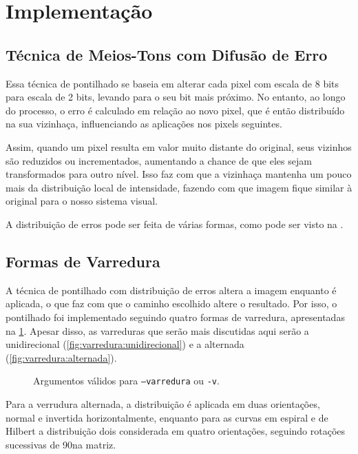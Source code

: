 \section{Implementação} \label{sec:impl}

\subsection{Técnica de Meios-Tons com Difusão de Erro}

    Essa técnica de pontilhado se baseia em alterar cada pixel com escala de 8 bits para escala de 2 bits, levando para o seu bit mais próximo. No entanto, ao longo do processo, o erro é calculado em relação ao novo pixel, que é então distribuído na sua vizinhaça, influenciando as aplicações nos pixels seguintes.

    Assim, quando um pixel resulta em valor muito distante do original, seus vizinhos são reduzidos ou incrementados, aumentando a chance de que eles sejam transformados para outro nível. Isso faz com que a vizinhaça mantenha um pouco mais da distribuição local de intensidade, fazendo com que imagem fique similar à original para o nosso sistema visual.

    A distribuição de erros pode ser feita de várias formas, como pode ser visto na .

\subsection{Formas de Varredura} \label{sec:varredura}

    A técnica de pontilhado com distribuição de erros altera a imagem enquanto é aplicada, o que faz com que o caminho escolhido altere o resultado. Por isso, o pontilhado foi implementado seguindo quatro formas de varredura, apresentadas na \cref{fig:varredura}. Apesar disso, as varreduras que serão mais discutidas aqui serão a unidirecional (\ref{fig:varredura:unidirecional}) e a alternada (\ref{fig:varredura:alternada}).

    \begin{figure}[H]
        \centering
        

        \caption{Argumentos válidos para \texttt{--varredura} ou \texttt{-v}.}
        \label{fig:varredura}
    \end{figure}

    Para a verrudura alternada, a distribuição é aplicada em duas orientações, normal e invertida horizontalmente, enquanto para as curvas em espiral e de Hilbert a distribuição dois considerada em quatro orientações, seguindo rotações sucessivas de 90\textdegree na matriz.

